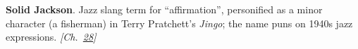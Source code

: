 \textbf{Solid Jackson}. Jazz slang term for ``affirmation'', personified as a minor character (a fisherman) in Terry Pratchett's \emph{Jingo}; the name puns on 1940s jazz expressions. \emph{[Ch.~\hyperref[ch:negativetemperature]{28}]}

